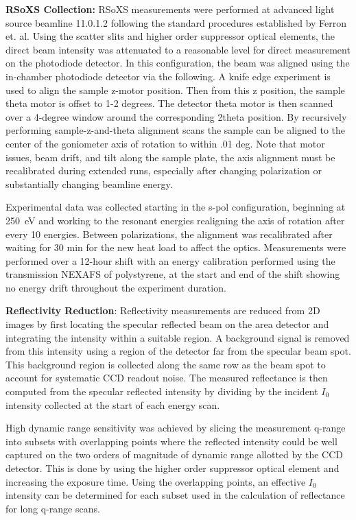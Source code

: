 \textbf{RSoXS Collection:} RSoXS measurements were performed at advanced light source beamline 11.0.1.2 following the standard procedures established by Ferron et. al. Using the scatter slits and higher order suppressor optical elements, the direct beam intensity was attenuated to a reasonable level for direct measurement on the photodiode detector. In this configuration, the beam was aligned using the in-chamber photodiode detector via the following. A knife edge experiment is used to align the sample z-motor position. Then from this z position, the sample theta motor is offset to 1-2 degrees. The detector theta motor is then scanned over a 4-degree window around the corresponding 2theta position. By recursively performing sample-z-and-theta alignment scans the sample can be aligned to the center of the goniometer axis of rotation to within .01 deg. Note that motor issues, beam drift, and tilt along the sample plate, the axis alignment must be recalibrated during extended runs, especially after changing polarization or substantially changing beamline energy.

Experimental data was collected starting in the s-pol configuration, beginning at \qty{250}{eV} and working to the resonant energies realigning the axis of rotation after every 10 energies. Between polarizations, the alignment was recalibrated after waiting for 30 min for the new heat load to affect the optics. Measurements were performed over a 12-hour shift with an energy calibration performed using the transmission NEXAFS of polystyrene, at the start and end of the shift showing no energy drift throughout the experiment duration.

\textbf{Reflectivity Reduction}: Reflectivity measurements are reduced from 2D images by first locating the specular reflected beam on the area detector and integrating the intensity within a suitable region. A background signal is removed from this intensity using a region of the detector far from the specular beam spot. This background region is collected along the same row as the beam spot to account for systematic CCD readout noise. The measured reflectance is then computed from the specular reflected intensity by dividing by the incident \(I_{0}\) intensity collected at the start of each energy scan.

High dynamic range sensitivity was achieved by slicing the measurement q-range into subsets with overlapping points where the reflected intensity could be well captured on the two orders of magnitude of dynamic range allotted by the CCD detector. This is done by using the higher order suppressor optical element and increasing the exposure time. Using the overlapping points, an effective \(I_{0}\) intensity can be determined for each subset used in the calculation of reflectance for long q-range scans.

